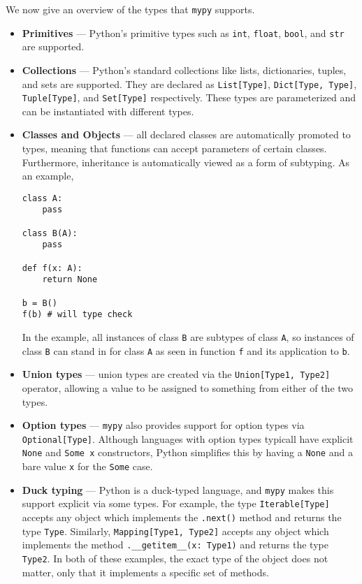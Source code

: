 \documentclass{book}
\begin{document}
We now give an overview of the types that \texttt{mypy} supports.
\begin{itemize}
    \item \textbf{Primitives} --- Python's primitive types such as \texttt{int}, \texttt{float}, \texttt{bool}, and \texttt{str} are supported.

    \item \textbf{Collections} --- Python's standard collections like lists, dictionaries, tuples, and sets are supported. They are declared as \texttt{List[Type]}, \texttt{Dict[Type, Type]}, \texttt{Tuple[Type]}, and \texttt{Set[Type]} respectively. These types are parameterized and can be instantiated with different types.

    \item \textbf{Classes and Objects} --- all declared classes are automatically promoted to types, meaning that functions can accept parameters of certain classes. Furthermore, inheritance is automatically viewed as a form of subtyping. As an example,

    \begin{singlespace*}
    \begin{verbatim}
class A:
    pass

class B(A):
    pass

def f(x: A):
    return None

b = B()
f(b) # will type check\end{verbatim}
    \end{singlespace*}
    In the example, all instances of class \texttt{B} are subtypes of class \texttt{A}, so instances of class \texttt{B} can stand in for class \texttt{A} as seen in function \texttt{f} and its application to \texttt{b}.

    \item \textbf{Union types} --- union types are created via the \texttt{Union[Type1, Type2]} operator, allowing a value to be assigned to something from either of the two types.

    \item \textbf{Option types} --- \texttt{mypy} also provides support for option types via \texttt{Optional[Type]}. Although languages with option types typicall have explicit \texttt{None} and \texttt{Some x} constructors, Python simplifies this by having a \texttt{None} and a bare value \texttt{x} for the \texttt{Some} case.

    \item \textbf{Duck typing} --- Python is a duck-typed language, and \texttt{mypy} makes this support explicit via some types. For example, the type \texttt{Iterable[Type]} accepts any object which implements the \texttt{.next()} method and returns the type \texttt{Type}. Similarly, \texttt{Mapping[Type1, Type2]} accepts any object which implements the method \texttt{.__getitem__(x: Type1)} and returns the type \texttt{Type2}. In both of these examples, the exact type of the object does not matter, only that it implements a specific set of methods.


\end{itemize}
\end{document}
